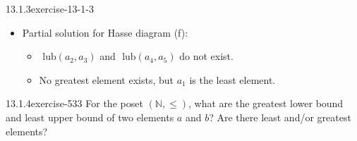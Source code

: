 \documentclass[twoside,10pt,]{book}
\numberwithin{equation}{section}
\begin{document}
\begin{divisionsolution}{13.1.3}{}{exercise-13-1-3}
\begin{itemize}[label=\textbullet]
\begin{itemize}[label=$\circ$]
\begin{equation*}
\begin{array}{c|c}
\begin{array}{c|ccccc}
\lor &a_1 & a_2 & a_3 & a_4 & a_5 \\
\hline
a_1 & a_1 &a_2 & a_3 & a_4 & a_5 \\
a_2 & a_2 & a_2 & a_4 & a_4 & a_5 \\
a_3 &a_3 & a_4 & a_3 & a_4 & a_5 \\
a_4 & a_4 & a_4 & a_4 & a_4 & a_5 \\
a_5 & a_5 & a_5 & a_5 & a_5 & a_5 \\
\end{array}
&\quad
\begin{array}{c|ccccc}
\land & a_1 & a_2 & a_3 & a_4 & a_5 \\\hline
a_1 &	 a_1 & a_1 & a_1 & a_1 & a_1 \\
a_2 &	a_1 & a_2 & a_1 & a_2 & a_2 \\
a_3 &	a_1 & a_1 & a_3 & a_3 & a_3 \\
a_4 &	a_1 & a_2 & a_3 & a_4 & a_4 \\
a_5 &	a_1 & a_2 & a_3 & a_4 & a_5 \\
\end{array}
\end{array}
\end{equation*}
%
\par
\hypertarget{p-4811}{}%
\(a_1\) is the least element and \(a_5\) is the greatest element.%
\end{itemize}
%
\item{}\hypertarget{p-4812}{}%
Partial solution for Hasse diagram (f):%
\begin{itemize}[label=$\circ$]
\item{}\hypertarget{p-4813}{}%
\(\textrm{ lub}\left(a_2, a_3\right)\) and \(\textrm{ lub}\left( a_4,a_5\right)\)  do not exist.%
\item{}\hypertarget{p-4814}{}%
No greatest element exists, but \(a_1\) is the least element.%
\end{itemize}
%
\end{itemize}
%
\end{divisionsolution}%
\begin{divisionsolution}{13.1.4}{}{exercise-533}%
\hypertarget{p-4815}{}%
For the poset \((\mathbb{N},\leq )\), what are the greatest lower bound and least upper bound of two elements \(a\) and \(b\)? Are there least and\slash{}or greatest elements?%
\end{divisionsolution}%
\end{document}

